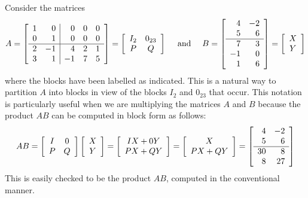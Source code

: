 Consider the matrices
\begin{equation*}
A = \left[ \begin{array}{rr|rrr}
1 & 0 & 0 & 0 & 0 \\
0 & 1 & 0 & 0 & 0 \\
\hline
2 & -1 & 4 & 2 & 1 \\
3 & 1 & -1 & 7 & 5
\end{array} \right] = \left[ \begin{array}{cc}
I_{2} & 0_{23} \\
P & Q
\end{array} \right] \quad \mbox{ and } \quad B = \left[ \begin{array}{rr}
4 & -2 \\
5 & 6 \\
\hline
7 & 3 \\
-1 & 0 \\
1 & 6
\end{array} \right] = \left[ \begin{array}{c}
X \\
Y
\end{array} \right]
\end{equation*}
where the blocks have been labelled as indicated. This is a natural way to partition $A$ into blocks in view of the blocks $I_{2}$ and $0_{23}$ that occur. This notation is particularly useful when we are multiplying the matrices $A$ and $B$ because the product $AB$ can be computed in block form as follows:
\begin{equation*}
AB = \left[ \begin{array}{cc}
I & 0 \\
P & Q
\end{array} \right] \left[ \begin{array}{c}
X \\
Y
\end{array} \right] = \left[ \begin{array}{c}
IX + 0Y \\
PX + QY
\end{array} \right] = \left[ \begin{array}{c}
X \\
PX + QY
\end{array} \right] = \left[ \begin{array}{rr}
4 & -2 \\
5 & 6 \\
\hline
30 & 8 \\
8 & 27
\end{array} \right]
\end{equation*}
This is easily checked to be the product $AB$, computed in the conventional manner.


